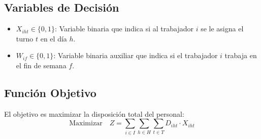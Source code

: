 \documentclass{article}
\begin{document}
\subsection*{Variables de Decisión}
\begin{itemize}
    \item $X_{iht} \in \{0, 1\}$: Variable binaria que indica si al trabajador $i$ se le asigna el turno $t$ en el día $h$.
    \item $W_{if} \in \{0, 1\}$: Variable binaria auxiliar que indica si el trabajador $i$ trabaja en el fin de semana $f$.
\end{itemize}

\subsection*{Función Objetivo}
El objetivo es maximizar la disposición total del personal:
\begin{equation}
    \text{Maximizar} \quad Z = \sum_{i \in I} \sum_{h \in H} \sum_{t \in T} D_{iht} \cdot X_{iht}
\end{equation}
\end{document}
